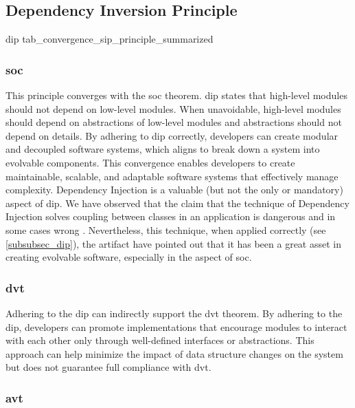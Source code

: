 \subsection{Dependency Inversion Principle}

\compareTable
{\acrlong*{dip}}
{tab_convergence_sip_principle_summarized}
{\addEvalRow{\conv & \partconv & \partconv & \noconv}}

\subsubsection{\acrlong*{soc}}

This principle converges with the \gls{soc} theorem. \gls{dip} states that high-level
modules should not depend on low-level modules. When unavoidable, high-level modules
should depend on abstractions of low-level modules and abstractions should not depend on
details. By adhering to \gls{dip} correctly, developers can create modular and decoupled
software systems, which aligns to break down a system into evolvable components. This
convergence enables developers to create maintainable, scalable, and adaptable software
systems that effectively manage complexity. Dependency Injection is a valuable (but not
the only or mandatory) aspect of \gls{dip}. We have observed that the claim that the
technique of Dependency Injection solves coupling between classes in an application is
dangerous and in some cases wrong \parencite[215]{mannaert_normalized_2016}. Nevertheless,
this technique, when applied correctly (see \ref{subsubsec_dip}), the artifact have
pointed out that it has been a great asset in creating evolvable software, especially in
the aspect of \gls{soc}.

\subsubsection{\acrlong*{dvt}} 

Adhering to the \gls{dip} can indirectly support the \gls{dvt} theorem. By adhering to the
\gls{dip}, developers can promote implementations that encourage modules to interact with
each other only through well-defined interfaces or abstractions. This approach can help
minimize the impact of data structure changes on the system but does not guarantee full
compliance with \gls{dvt}.

\subsubsection{\acrlong*{avt}}

